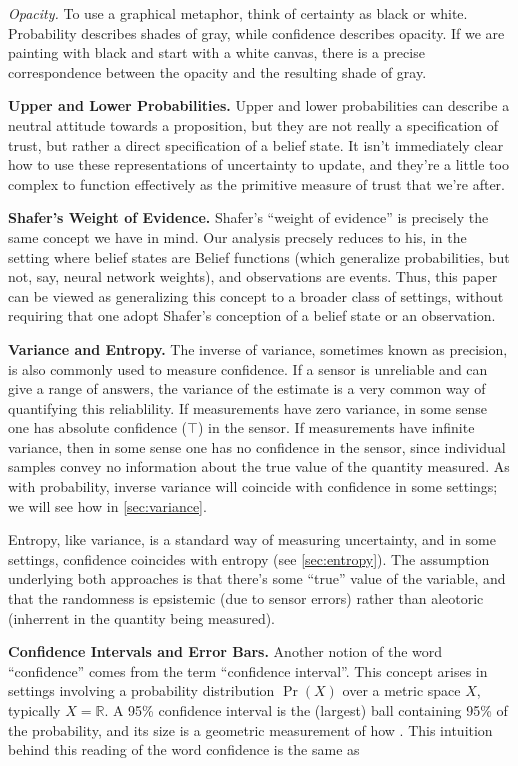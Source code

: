 \textit{Opacity.} To use a graphical metaphor, think of certainty as black or white.
Probability describes shades of gray, while confidence describes opacity. 
If we are painting with black and start with a white canvas, there is a precise correspondence between the opacity and the resulting shade of gray.

\textbf{Upper and Lower Probabilities.}
Upper and lower probabilities can describe a neutral attitude towards a proposition, but they are not really a specification of trust, but rather a direct specification of a belief state. 
It isn't immediately clear how to use these representations of uncertainty to update, and they're a little too complex to function effectively as the primitive measure of trust that we're after.


\textbf{Shafer's Weight of Evidence.}
Shafer's ``weight of evidence'' is precisely the same concept we have in mind. 
Our analysis precsely reduces to his, in the setting where belief states are Belief functions (which generalize probabilities, but not, say, neural network weights), and observations are events. 
Thus, this paper can be viewed as generalizing this concept to a broader class of settings, without requiring that one adopt Shafer's conception of a belief state or an observation. 


\textbf{Variance and Entropy.}
The inverse of variance, sometimes known as precision,
	is also commonly used to measure confidence. 
If a sensor is unreliable and can give a range of answers, the variance of the estimate is a very common way of quantifying this reliablility.
If measurements have zero variance, in some sense one has absolute confidence ($\top$) in the sensor. If measurements have infinite variance, then in some sense one has no confidence in the sensor, since individual samples convey no information about the true value of the quantity measured.
As with probability, inverse variance will coincide with confidence in some settings; we will see how in \cref{sec:variance}.

Entropy, like variance, is a standard way of measuring uncertainty, and in some settings, confidence coincides with entropy (see \cref{sec:entropy}).
The assumption underlying both approaches is that there's some ``true'' value of the variable, and that the randomness is epsistemic (due to sensor errors) rather than aleotoric (inherrent in the quantity being measured). 

\textbf{Confidence Intervals and Error Bars.}
Another notion of the word ``confidence'' comes from the term ``confidence interval''.
This concept arises in settings involving a probability distribution $\Pr(X)$ over a metric space $X$, typically $X = \mathbb R$. 
A 95\% confidence interval is the (largest) ball containing 95\% of the probability, and its size is a geometric measurement of how . 
This intuition behind this reading of the word confidence is the same as  
